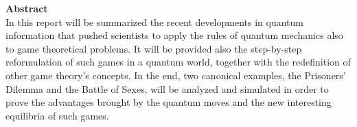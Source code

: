 \hfill

\textbf{Abstract}\\
In this report will be summarized the recent developments in quantum information that pushed scientists to apply the rules of quantum mechanics also to game theoretical problems. It will be provided also the step-by-step reformulation of such games in a quantum world, together with the redefinition of other game theory's concepts. In the end, two canonical examples, the Prisoners' Dilemma and the Battle of Sexes, will be analyzed and simulated in order to prove the advantages brought by the quantum moves and the new interesting equilibria of such games.\\
